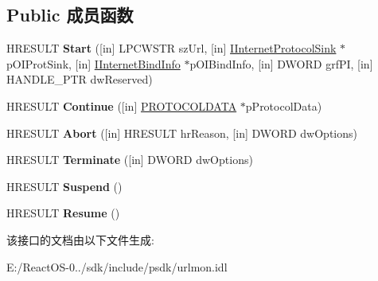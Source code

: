\subsection*{Public 成员函数}
\begin{DoxyCompactItemize}
\item 
\mbox{\label{interface_i_internet_protocol_root_a6be43d64a401b741e3498735d27d93d1}} 
H\+R\+E\+S\+U\+LT {\bfseries Start} (\mbox{[}in\mbox{]} L\+P\+C\+W\+S\+TR sz\+Url, \mbox{[}in\mbox{]} \hyperlink{interface_i_internet_protocol_sink}{I\+Internet\+Protocol\+Sink} $\ast$p\+O\+I\+Prot\+Sink, \mbox{[}in\mbox{]} \hyperlink{interface_i_internet_bind_info}{I\+Internet\+Bind\+Info} $\ast$p\+O\+I\+Bind\+Info, \mbox{[}in\mbox{]} D\+W\+O\+RD grf\+PI, \mbox{[}in\mbox{]} H\+A\+N\+D\+L\+E\+\_\+\+P\+TR dw\+Reserved)
\item 
\mbox{\label{interface_i_internet_protocol_root_a7ce703b49162f37d612df7c96a9d4413}} 
H\+R\+E\+S\+U\+LT {\bfseries Continue} (\mbox{[}in\mbox{]} \hyperlink{struct_i_internet_protocol_root_1_1__tag_p_r_o_t_o_c_o_l_d_a_t_a}{P\+R\+O\+T\+O\+C\+O\+L\+D\+A\+TA} $\ast$p\+Protocol\+Data)
\item 
\mbox{\label{interface_i_internet_protocol_root_ad4c04bb996f38776cf6d29b70f5af35c}} 
H\+R\+E\+S\+U\+LT {\bfseries Abort} (\mbox{[}in\mbox{]} H\+R\+E\+S\+U\+LT hr\+Reason, \mbox{[}in\mbox{]} D\+W\+O\+RD dw\+Options)
\item 
\mbox{\label{interface_i_internet_protocol_root_aac0b47456e2532c7f62f0699237f95a0}} 
H\+R\+E\+S\+U\+LT {\bfseries Terminate} (\mbox{[}in\mbox{]} D\+W\+O\+RD dw\+Options)
\item 
\mbox{\label{interface_i_internet_protocol_root_a321fc7b1eee8a33640e4e3d71e29f66c}} 
H\+R\+E\+S\+U\+LT {\bfseries Suspend} ()
\item 
\mbox{\label{interface_i_internet_protocol_root_aadd238dc924bc7d0d9072affdc9e3cee}} 
H\+R\+E\+S\+U\+LT {\bfseries Resume} ()
\end{DoxyCompactItemize}


该接口的文档由以下文件生成\+:\begin{DoxyCompactItemize}
\item 
E\+:/\+React\+O\+S-\/0../sdk/include/psdk/urlmon.\+idl\end{DoxyCompactItemize}
